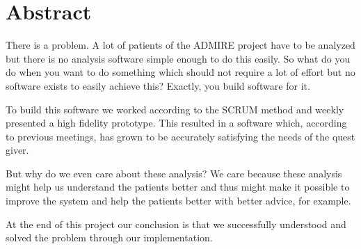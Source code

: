 \chapter*{Abstract}

There is a problem. A lot of patients of the ADMIRE project have to be analyzed but there is no analysis software simple enough to do this easily. So what do you do when you want to do something which should not require a lot of effort but no software exists to easily achieve this? Exactly, you build software for it.

To build this software we worked according to the SCRUM method and weekly presented a high fidelity prototype. This resulted in a software which, according to previous meetings, has grown to be accurately satisfying the needs of the quest giver. %

But why do we even care about these analysis? We care because these analysis might help us understand the patients better and thus might make it possible to improve the system and help the patients better with better advice, for example.

At the end of this project our conclusion is that we successfully understood and solved the problem through our implementation.


